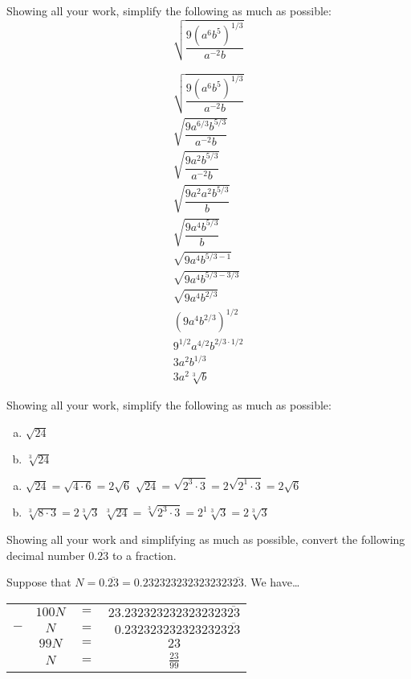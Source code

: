 \documentclass[12pt,letterpaper]{exam}
\begin{document}
\begin{questions}
\newpage
\question[5] Showing all your work, simplify the following as much as possible: 
	\[
	\sqrt{ \dfrac{9 (a^6 b^5)^{1/3}}{a^{-2} b} }
	\] \pspace

\sol 
	\[
	\begin{gathered}
	\sqrt{ \dfrac{9 (a^6 b^5)^{1/3}}{a^{-2} b} } \\[0.3cm]
	\sqrt{ \dfrac{9 a^{6/3} b^{5/3}}{a^{-2} b} } \\[0.3cm]
	\sqrt{ \dfrac{9 a^2 b^{5/3}}{a^{-2} b} } \\[0.3cm]
	\sqrt{ \dfrac{9 a^2 a^2 b^{5/3}}{b} } \\[0.3cm]
	\sqrt{ \dfrac{9 a^4 b^{5/3}}{b} } \\[0.3cm]
	\sqrt{9 a^4 b^{5/3-1} } \\[0.3cm]
	\sqrt{9 a^4 b^{5/3-3/3} } \\[0.3cm]
	\sqrt{9 a^4 b^{2/3} } \\[0.3cm]
	\left( 9 a^4 b^{2/3} \right)^{1/2} \\[0.3cm]
	9^{1/2} a^{4/2} b^{2/3 \cdot 1/2} \\[0.3cm]
	3 a^2 b^{1/3} \\[0.3cm]
	3 a^2 \sqrt[3]{b}
	\end{gathered}
	\]



\newpage
\question[5] Showing all your work, simplify the following as much as possible:
	\begin{enumerate}[(a)]
	\item $\sqrt{24}$
	\item $\sqrt[3]{24}$
	\end{enumerate} \pspace

\sol 
\begin{enumerate}[(a)]
\item $\sqrt{24}= \sqrt{4 \cdot 6}= 2 \sqrt{6}$  \quad $\sqrt{24}= \sqrt{2^3 \cdot 3}= 2 \sqrt{2^1 \cdot 3}= 2 \sqrt{6}$ \pspace

\item $\sqrt[3]{8 \cdot 3}= 2 \sqrt[3]{3}$  \quad $\sqrt[3]{24}= \sqrt[3]{2^3 \cdot 3}= 2^1 \sqrt[3]{3}= 2 \sqrt[3]{3}$
\end{enumerate}



\newpage
\question[5] Showing all your work and simplifying as much as possible, convert the following decimal number $0.\overline{23}$ to a fraction. \pspace

\sol Suppose that $N= 0.\overline{23}= 0.2323232323232323\overline{23}$. We have\dots
	\begin{table}[!ht]
	\centering\small
	\begin{tabular}{rccc}
	& $100N$ & $=$ & $23.2323232323232323\overline{23}$ \\ 
	$-$ & $N$ & $=$ & $\phantom{2}0.2323232323232323\overline{23}$ \\ \hline
	& $99N$ & $=$ & $23$ \\[0.1cm]
	& $N$ & $=$ & $\frac{23}{99}$
	\end{tabular}
	\end{table} \par


\end{questions}
\end{document}
